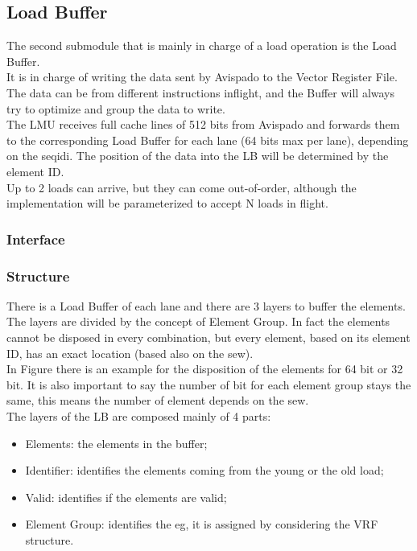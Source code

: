 \subsection{Load Buffer}
The second submodule that is mainly in charge of a load operation is the Load Buffer.\\
It is in charge of writing the data sent by Avispado to the Vector Register File. The data can be from different instructions inflight, and the Buffer will always try to optimize and group the data to write.\\

The LMU receives full cache lines of 512 bits from Avispado and forwards them to the corresponding Load Buffer for each lane (64 bits max per lane), depending on the seq\+id\+i. The position of the data into the LB will be determined by the element ID.\\

Up to 2 loads can arrive, but they can come out-of-order, although the implementation will be parameterized to accept N loads in flight.
\subsubsection{Interface}

\subsubsection{Structure}
There is a Load Buffer of each lane and there are 3 layers to buffer the elements. The layers are divided by the concept of Element Group. In fact the elements cannot be disposed in every combination, but every element, based on its element ID, has an exact location (based also on the sew).\\

In Figure there is an example for the disposition of the elements for 64 bit or 32 bit. It is also important to say the number of bit for each element group stays the same, this means the number of element depends on the sew.\\

The layers of the LB are composed mainly of 4 parts:
\begin{itemize}
    \item Elements: the elements in the buffer;
    
    \item Identifier: identifies the elements coming from the young or the old load;
    
    \item Valid: identifies if the elements are valid;
    
    \item Element Group: identifies the eg, it is assigned by considering the VRF structure.
\end{itemize}

